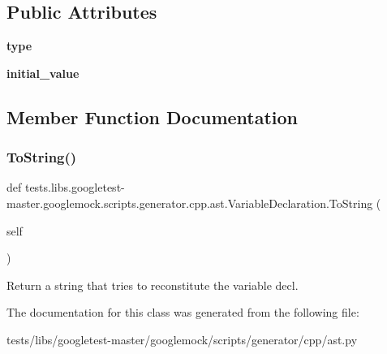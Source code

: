\subsection*{Public Attributes}
\begin{DoxyCompactItemize}
\item 
\mbox{\label{classtests_1_1libs_1_1googletest-master_1_1googlemock_1_1scripts_1_1generator_1_1cpp_1_1ast_1_1VariableDeclaration_ae5b2ba894636ccd44505ffd795d2d3bd}} 
{\bfseries type}
\item 
\mbox{\label{classtests_1_1libs_1_1googletest-master_1_1googlemock_1_1scripts_1_1generator_1_1cpp_1_1ast_1_1VariableDeclaration_a9622e477758243adbe4a28f6ce44014b}} 
{\bfseries initial\+\_\+value}
\end{DoxyCompactItemize}


\subsection{Member Function Documentation}
\mbox{\label{classtests_1_1libs_1_1googletest-master_1_1googlemock_1_1scripts_1_1generator_1_1cpp_1_1ast_1_1VariableDeclaration_a6da6efe50bd344bf194e8e8748519ed3}} 
\subsubsection{\texorpdfstring{To\+String()}{ToString()}}
{\footnotesize\ttfamily def tests.\+libs.\+googletest-\/master.\+googlemock.\+scripts.\+generator.\+cpp.\+ast.\+Variable\+Declaration.\+To\+String (\begin{DoxyParamCaption}\item[{}]{self }\end{DoxyParamCaption})}

\begin{DoxyVerb}Return a string that tries to reconstitute the variable decl.\end{DoxyVerb}
 

The documentation for this class was generated from the following file\+:\begin{DoxyCompactItemize}
\item 
tests/libs/googletest-\/master/googlemock/scripts/generator/cpp/ast.\+py\end{DoxyCompactItemize}
